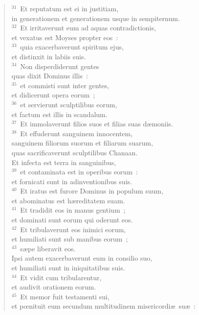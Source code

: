 \begin{flushleft}
\begin{verse}
${}^{31}$~Et reputatum est ei in justitiam,\\ in generationem et generationem usque in sempiternum.\\
${}^{32}$~Et irritaverunt eum ad aquas contradictionis,\\ et vexatus est Moyses propter eos~:\\
${}^{33}$~quia exacerbaverunt spiritum ejus,\\ et distinxit in labiis suis.\\
${}^{34}$~Non disperdiderunt gentes\\ quas dixit Dominus illis~:\\
${}^{35}$~et commisti sunt inter gentes,\\ et didicerunt opera eorum~;\\
${}^{36}$~et servierunt sculptilibus eorum,\\ et factum est illis in scandalum.\\
${}^{37}$~Et immolaverunt filios suos et filias suas d\ae moniis.\\
${}^{38}$~Et effuderunt sanguinem innocentem,\\ sanguinem filiorum suorum et filiarum suarum,\\ quas sacrificaverunt sculptilibus Chanaan.\\ Et infecta est terra in sanguinibus,\\
${}^{39}$~et contaminata est in operibus eorum~:\\ et fornicati sunt in adinventionibus suis.\\
${}^{40}$~Et iratus est furore Dominus in populum suum,\\ et abominatus est h\ae reditatem suam.\\
${}^{41}$~Et tradidit eos in manus gentium~;\\ et dominati sunt eorum qui oderunt eos.\\
${}^{42}$~Et tribulaverunt eos inimici eorum,\\ et humiliati sunt sub manibus eorum~;\\
${}^{43}$~s\ae pe liberavit eos.\\ Ipsi autem exacerbaverunt eum in consilio suo,\\ et humiliati sunt in iniquitatibus suis.\\
${}^{44}$~Et vidit cum tribularentur,\\ et audivit orationem eorum.\\
${}^{45}$~Et memor fuit testamenti sui,\\ et pœnituit eum secundum multitudinem misericordi\ae\ su\ae~:\\

\end{verse}
\end{flushleft}

